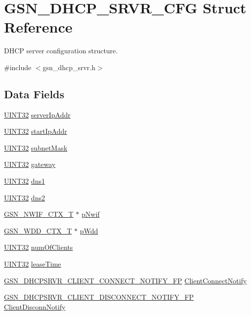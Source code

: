 \hypertarget{a00044}{
\section{GSN\_\-DHCP\_\-SRVR\_\-CFG Struct Reference}
\label{a00044}
}


DHCP server configuration structure.  




{\ttfamily \#include $<$gsn\_\-dhcp\_\-srvr.h$>$}

\subsection*{Data Fields}
\begin{DoxyCompactItemize}
\item 
\hyperlink{a00660_gae1e6edbbc26d6fbc71a90190d0266018}{UINT32} \hyperlink{a00044_a09261ac30de0001f89753c8f3869ad2f}{serverIpAddr}
\item 
\hyperlink{a00660_gae1e6edbbc26d6fbc71a90190d0266018}{UINT32} \hyperlink{a00044_abb7d94d80f2e2e351c9dc9be6e6a6372}{startIpAddr}
\item 
\hyperlink{a00660_gae1e6edbbc26d6fbc71a90190d0266018}{UINT32} \hyperlink{a00044_a57e84f1cb54cb270925550e459768abe}{subnetMask}
\item 
\hyperlink{a00660_gae1e6edbbc26d6fbc71a90190d0266018}{UINT32} \hyperlink{a00044_a1305b67d400967bbebc27842a0d34ab7}{gateway}
\item 
\hyperlink{a00660_gae1e6edbbc26d6fbc71a90190d0266018}{UINT32} \hyperlink{a00044_af7cddde4fa5268b2b98e6f9c96f777ae}{dns1}
\item 
\hyperlink{a00660_gae1e6edbbc26d6fbc71a90190d0266018}{UINT32} \hyperlink{a00044_a0c87d9079482808f8e8ae6ed329547a3}{dns2}
\item 
\hyperlink{a00167}{GSN\_\-NWIF\_\-CTX\_\-T} $\ast$ \hyperlink{a00044_a98d510676ecd134a5e9ac61bf222cded}{pNwif}
\item 
\hyperlink{a00108}{GSN\_\-WDD\_\-CTX\_\-T} $\ast$ \hyperlink{a00044_a97684b58b7a05f9b282a86a26929e1ba}{pWdd}
\item 
\hyperlink{a00660_gae1e6edbbc26d6fbc71a90190d0266018}{UINT32} \hyperlink{a00044_a90adf637fd2556c882bc825710d7829f}{numOfClients}
\item 
\hyperlink{a00660_gae1e6edbbc26d6fbc71a90190d0266018}{UINT32} \hyperlink{a00044_abad371550e06d9d8f1eab19c6ce4cf80}{leaseTime}
\item 
\hyperlink{a00482_a4e4c9cdf544b20379a6322b6f2466dd2}{GSN\_\-DHCPSRVR\_\-CLIENT\_\-CONNECT\_\-NOTIFY\_\-FP} \hyperlink{a00044_a79c7531f6c009a9edf285607476d8dda}{ClientConnectNotify}
\item 
\hyperlink{a00482_a05462468438cc4b6c8ec15d1a0cdecb6}{GSN\_\-DHCPSRVR\_\-CLIENT\_\-DISCONNECT\_\-NOTIFY\_\-FP} \hyperlink{a00044_a529afc0130cceb30c97f8bb886d04068}{ClientDisconnNotify}
\end{DoxyCompactItemize}


